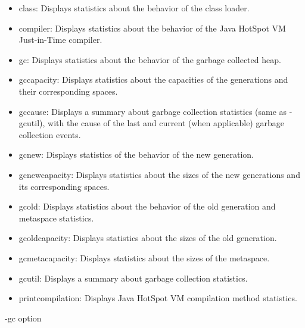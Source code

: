 \begin{itemize}

    \item class: Displays statistics about the behavior of the class loader.

    \item compiler: Displays statistics about the behavior of the Java HotSpot VM Just-in-Time compiler.

    \item gc: Displays statistics about the behavior of the garbage collected heap.

    \item gccapacity: Displays statistics about the capacities of the generations and their corresponding spaces.

    \item gccause: Displays a summary about garbage collection statistics (same as -gcutil), with the cause of the last and current (when applicable) garbage collection events.

    \item gcnew: Displays statistics of the behavior of the new generation.

    \item gcnewcapacity: Displays statistics about the sizes of the new generations and its corresponding spaces.

    \item gcold: Displays statistics about the behavior of the old generation and metaspace statistics.

    \item gcoldcapacity: Displays statistics about the sizes of the old generation.

    \item gcmetacapacity: Displays statistics about the sizes of the metaspace.

    \item gcutil: Displays a summary about garbage collection statistics.

    \item printcompilation: Displays Java HotSpot VM compilation method statistics.
    
\end{itemize}


-gc option

